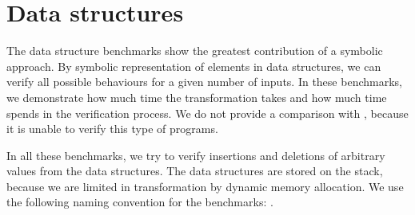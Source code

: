 




\section{Data structures}

The data structure benchmarks show the greatest contribution of a symbolic
approach. By symbolic representation of elements in data structures, we can
verify all possible behaviours for a given number of inputs. In these
benchmarks, we demonstrate how much time the transformation takes and how
much time \DIVINE spends in the verification process. We do not provide a
comparison with \SymDIVINE, because it is unable to verify this type of
programs.

In all these benchmarks, we try to verify insertions and deletions of arbitrary
values from the data structures. The data structures are stored on the
stack, because we are limited in transformation by dynamic memory allocation.
We use the following naming convention for the benchmarks: .

